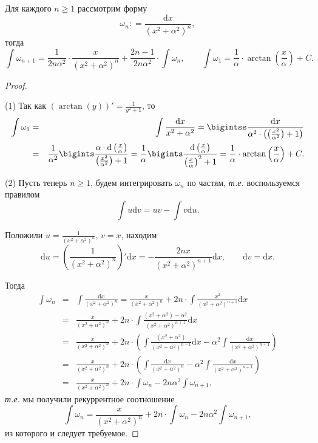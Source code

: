 \begin{lemma}\label{int_of_x^2+a^2}
    Для каждого $n\ge 1$ рассмотрим форму
    \[
     \omega_n: = \frac{\mathrm{d}x}{(x^2 + \alpha^2)^n},
    \]
    тогда
    \[
     \int \omega_{n+1} = \frac{1}{2n\alpha^2}\cdot \frac{x}{(x^2 + \alpha^2)^n} + \frac{2n-1}{2n\alpha^2} \cdot\int \omega_n, \qquad \int \omega_1 = \frac{1}{\alpha} \cdot \arctan\left( \frac{x}{\alpha}\right) + C.
    \]
\end{lemma}
\begin{proof}~

(1) Так как $(\arctan(y))' = \frac{1}{y^2 + 1}$, то
\begin{eqnarray*}
    \int \omega_1 &=& \int \frac{\mathrm{d}x}{x^2 + \alpha^2}  = \bigintss \frac{\mathrm{d}x}{\alpha^2\cdot\left (\left( \frac{x^2}{\alpha^2} \right) + 1\right)}\\
    &=& \frac{1}{\alpha^2} \bigints \frac{\alpha \cdot\mathrm{d}\left(\frac{x}{\alpha}\right)}{\left( \frac{x^2}{\alpha^2} \right) + 1} = \frac{1}{\alpha} \bigints \frac{ \mathrm{d}\left(\frac{x}{\alpha}\right)}{\left( \frac{x}{\alpha} \right)^2 + 1} = \frac{1}{\alpha} \cdot \arctan\left( \frac{x}{\alpha}\right) + C.
\end{eqnarray*}

(2) Пусть теперь $n \ge 1$, будем интегрировать $\omega_n$ по частям, \textit{т.е.} воспользуемся правилом
\[
 \int u \mathrm{d}v = uv - \int v \mathrm{d}u.
\]

Положили $u = \frac{1}{(x^2 + \alpha^2)^n}$, $v = x$, находим
\[
 \mathrm{d}u = \left( \frac{1}{(x^2 + \alpha^2)^n} \right)'\mathrm{d}x = - \frac{2nx}{(x^2 + \alpha^2)^{n+1}}\mathrm{d}x, \qquad \mathrm{d}v = \mathrm{d}x.
\]

Тогда
\begin{eqnarray*}
    \int \omega_n &=& \int \frac{\mathrm{d}x}{(x^2 + \alpha^2)^n} = \frac{x}{(x^2 + \alpha^2)^n} + 2n \cdot \int \frac{x^2}{(x^2 + \alpha^2)^{n+1}}\mathrm{d}x \\
    &=& \frac{x}{(x^2 + \alpha^2)^n} + 2n \cdot \int \frac{(x^2+\alpha^2) - \alpha^2}{(x^2 + \alpha^2)^{n+1}}\mathrm{d}x \\
    &=& \frac{x}{(x^2 + \alpha^2)^n} + 2n \cdot \left( \int \frac{(x^2+\alpha^2)}{(x^2 + \alpha^2)^{n+1}}\mathrm{d}x - \alpha^2 \int  \frac{\mathrm{d}x}{(x^2 + \alpha^2)^{n+1}}\right) \\
    &=& \frac{x}{(x^2 + \alpha^2)^n} + 2n \cdot \left( \int \frac{\mathrm{d}x}{(x^2 + \alpha^2)^{n}} - \alpha^2 \int  \frac{\mathrm{d}x}{(x^2 + \alpha^2)^{n+1}}\right) \\
    &=&\frac{x}{(x^2 + \alpha^2)^n} + 2n\cdot \int \omega_n  - 2n\alpha^2 \int \omega_{n+1},
\end{eqnarray*}
\textit{т.е.} мы получили рекуррентное соотношение 
\[
 \int \omega_n = \frac{x}{(x^2 + \alpha^2)^n} + 2n\cdot \int \omega_n  - 2n\alpha^2 \int \omega_{n+1},
\]
из которого и следует требуемое.    
\end{proof}


